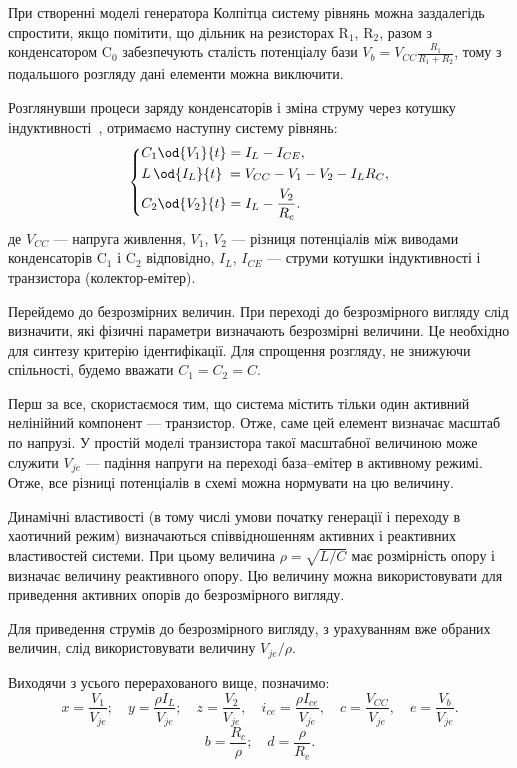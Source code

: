 При створенні моделі генератора Колпітца систему рівнянь можна
заздалегідь спростити, якщо помітити, що дільник на резисторах
$\mathrm{R}_1 $,
$\mathrm{R}_2 $, разом з конденсатором
$\mathrm{C}_0 $ забезпечують сталість потенціалу бази
$V_b = V_{CC} \frac{R_1}{R_1 + R_2} $, тому з подальшого розгляду дані елементи
можна виключити.

Розглянувши процеси заряду конденсаторів і зміна струму через
котушку індуктивності~\cite{zaeplnii_radio_calc}, отримаємо наступну
систему рівнянь:
%
\begin{equation}
\label{atu:eq:colp_phys}
\begin{dcases}
  C_1 \od{V_{1}}{t}  = I_L - I_{CE} , \\
  L\, \od{I_L}{t} \; = V_{CC} - V_{1} - V_{2} - I_L R_C , \\
  C_2 \od{V_{2}}{t}  = I_L - \frac{V_{2}}{R_e}.
\end{dcases}
\end{equation}
%
%
де
$V_{CC} $ --- напруга живлення,
$V_1 $, $ V_2 $ --- різниця потенціалів між виводами конденсаторів
$\mathrm{C}_1 $ і
$\mathrm{C}_2 $ відповідно,
$I_L $,
$I_{CE} $ --- струми котушки індуктивності і транзистора (колектор-емітер).


Перейдемо до безрозмірних величин. При переході до
безрозмірного вигляду слід визначити, які фізичні параметри
визначають безрозмірні величини. Це необхідно для синтезу
критерію ідентифікації. Для спрощення розгляду, не знижуючи
спільності, будемо вважати
$C_1 = C_2 = C $.

Перш за все, скористаємося тим, що система містить тільки
один активний нелінійний компонент --- транзистор. Отже, саме
цей елемент визначає масштаб по напрузі. У простій моделі
транзистора такої масштабної величиною може служити
$V_{je} $ --- падіння напруги на переході база--емітер в активному
режимі. Отже, все різниці потенціалів в схемі можна нормувати
на цю величину.

Динамічні властивості (в тому числі умови початку генерації
і переходу в хаотичний режим) визначаються співвідношенням
активних і реактивних властивостей системи. При цьому величина
$\rho = \sqrt{L/C} $ має розмірність опору і визначає величину
реактивного опору. Цю величину можна використовувати для
приведення активних опорів до безрозмірного вигляду.

Для приведення струмів до безрозмірного вигляду, з урахуванням
вже обраних величин, слід використовувати величину
$V_{je} / \rho $.


Виходячи з усього перерахованого вище, позначимо:
%
\[
  x = \frac{V_{1}}{V_{je}} ; \quad
  y = \frac{\rho I_L}{V_{je}} ; \quad
  z = \frac{V_{2}}{V_{je}}, \quad
  i_{ce} = \frac{\rho I_{ce}}{V_{je}}, \quad
  c = \frac{V_{CC}}{V_{je}}, \quad
  e = \frac{V_{b}}{V_{je}}.
\]
%
\[
  b = \frac{R_c}{\rho}; \quad
  d = \frac{\rho}{R_e}. %
\]

